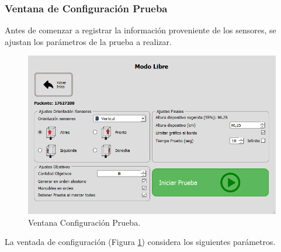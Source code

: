 \documentclass[12pt,a4paper]{article}
\begin{document}
\subsubsection{Ventana de Configuración Prueba}
Antes de comenzar a registrar la información proveniente de los sensores, se ajustan los parámetros de la prueba a realizar.

\begin{figure}[H]
	\centering
	\includegraphics[scale=0.6]{images/configurarPrueba}
	\caption{Ventana Configuración Prueba.}
	\label{fig:configurarPrueba}
\end{figure}

La ventada de configuración (Figura \ref{fig:configurarPrueba}) considera los siguientes parámetros.
\end{document}
